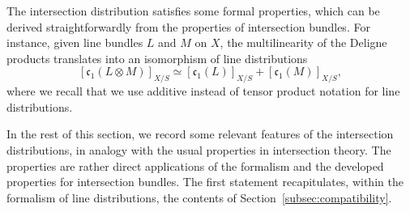\documentclass[JEP,XML,SOM,Unicode,published]{cedram}
\theoremstyle{plain}
\theoremstyle{definition}
\newcommand{\cfrak}{\mathfrak c}
\begin{document}
The intersection distribution satisfies some formal properties, which can be derived straightforwardly from the properties of intersection bundles. For instance, given line bundles $L$ and $M$ on $X$, the multilinearity of the Deligne products translates into an isomorphism of line distributions
\begin{equation}\label{eq:c1-tensor-product-distribution}
[\cfrak_{1}(L\otimes M)]_{X/S}\simeq [\cfrak_{1}(L)]_{X/S}+[\cfrak_{1}(M)]_{X/S},
\end{equation}
where we recall that we use additive instead of tensor product notation for line distributions.

In the rest of this section, we record some relevant features of the intersection distributions, in analogy with the usual properties in intersection theory. The properties are rather direct applications of the formalism and the developed properties for intersection bundles. The first statement recapitulates, within the formalism of line distributions, the contents of Section~\ref{subsec:compatibility}.
\end{document}
